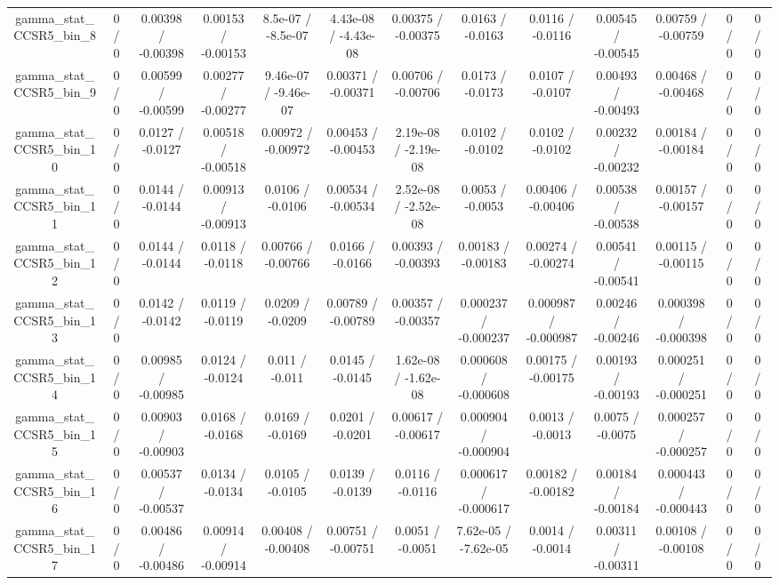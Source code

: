 \documentclass[10pt]{article}
\begin{document}
\begin{table}[htbp]
\begin{center}
\begin{tabular}{|c|c|c|c|c|c|c|c|c|c|c|c|c|}
  gamma_stat_CCSR5_bin_8 & 0 / 0 & 0.00398 / -0.00398 & 0.00153 / -0.00153 & 8.5e-07 / -8.5e-07 & 4.43e-08 / -4.43e-08 & 0.00375 / -0.00375 & 0.0163 / -0.0163 & 0.0116 / -0.0116 & 0.00545 / -0.00545 & 0.00759 / -0.00759 & 0 / 0 & 0 / 0 \\ 
  gamma_stat_CCSR5_bin_9 & 0 / 0 & 0.00599 / -0.00599 & 0.00277 / -0.00277 & 9.46e-07 / -9.46e-07 & 0.00371 / -0.00371 & 0.00706 / -0.00706 & 0.0173 / -0.0173 & 0.0107 / -0.0107 & 0.00493 / -0.00493 & 0.00468 / -0.00468 & 0 / 0 & 0 / 0 \\ 
  gamma_stat_CCSR5_bin_10 & 0 / 0 & 0.0127 / -0.0127 & 0.00518 / -0.00518 & 0.00972 / -0.00972 & 0.00453 / -0.00453 & 2.19e-08 / -2.19e-08 & 0.0102 / -0.0102 & 0.0102 / -0.0102 & 0.00232 / -0.00232 & 0.00184 / -0.00184 & 0 / 0 & 0 / 0 \\ 
  gamma_stat_CCSR5_bin_11 & 0 / 0 & 0.0144 / -0.0144 & 0.00913 / -0.00913 & 0.0106 / -0.0106 & 0.00534 / -0.00534 & 2.52e-08 / -2.52e-08 & 0.0053 / -0.0053 & 0.00406 / -0.00406 & 0.00538 / -0.00538 & 0.00157 / -0.00157 & 0 / 0 & 0 / 0 \\ 
  gamma_stat_CCSR5_bin_12 & 0 / 0 & 0.0144 / -0.0144 & 0.0118 / -0.0118 & 0.00766 / -0.00766 & 0.0166 / -0.0166 & 0.00393 / -0.00393 & 0.00183 / -0.00183 & 0.00274 / -0.00274 & 0.00541 / -0.00541 & 0.00115 / -0.00115 & 0 / 0 & 0 / 0 \\ 
  gamma_stat_CCSR5_bin_13 & 0 / 0 & 0.0142 / -0.0142 & 0.0119 / -0.0119 & 0.0209 / -0.0209 & 0.00789 / -0.00789 & 0.00357 / -0.00357 & 0.000237 / -0.000237 & 0.000987 / -0.000987 & 0.00246 / -0.00246 & 0.000398 / -0.000398 & 0 / 0 & 0 / 0 \\ 
  gamma_stat_CCSR5_bin_14 & 0 / 0 & 0.00985 / -0.00985 & 0.0124 / -0.0124 & 0.011 / -0.011 & 0.0145 / -0.0145 & 1.62e-08 / -1.62e-08 & 0.000608 / -0.000608 & 0.00175 / -0.00175 & 0.00193 / -0.00193 & 0.000251 / -0.000251 & 0 / 0 & 0 / 0 \\ 
  gamma_stat_CCSR5_bin_15 & 0 / 0 & 0.00903 / -0.00903 & 0.0168 / -0.0168 & 0.0169 / -0.0169 & 0.0201 / -0.0201 & 0.00617 / -0.00617 & 0.000904 / -0.000904 & 0.0013 / -0.0013 & 0.0075 / -0.0075 & 0.000257 / -0.000257 & 0 / 0 & 0 / 0 \\ 
  gamma_stat_CCSR5_bin_16 & 0 / 0 & 0.00537 / -0.00537 & 0.0134 / -0.0134 & 0.0105 / -0.0105 & 0.0139 / -0.0139 & 0.0116 / -0.0116 & 0.000617 / -0.000617 & 0.00182 / -0.00182 & 0.00184 / -0.00184 & 0.000443 / -0.000443 & 0 / 0 & 0 / 0 \\ 
  gamma_stat_CCSR5_bin_17 & 0 / 0 & 0.00486 / -0.00486 & 0.00914 / -0.00914 & 0.00408 / -0.00408 & 0.00751 / -0.00751 & 0.0051 / -0.0051 & 7.62e-05 / -7.62e-05 & 0.0014 / -0.0014 & 0.00311 / -0.00311 & 0.00108 / -0.00108 & 0 / 0 & 0 / 0 \\ 

\end{tabular}
\end{center}
\end{table}
\end{document}
